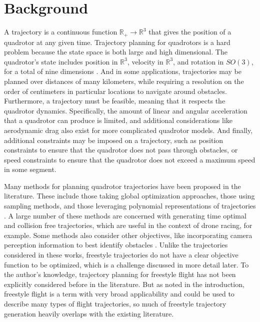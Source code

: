 \documentclass[pageno]{jpaper}
\begin{document}
\section{Background}

A trajectory is a continuous function $\mathbb{R}_+ \to \mathbb{R}^3$ that gives the position of a quadrotor at any given time. Trajectory planning for quadrotors is a hard problem because the state space is both large and high dimensional. The quadrotor's state includes position in $\mathbb{R}^3$, velocity in $\mathbb{R}^3$, and rotation in $SO(3)$, for a total of nine dimensions \cite{mueller}. And in some applications, trajectories may be planned over distances of many kilometers, while requiring a resolution on the order of centimeters in particular locations to navigate around obstacles. Furthermore, a trajectory must be feasible, meaning that it respects the quadrotor dynamics. Specifically, the amount of linear and angular acceleration that a quadrotor can produce is limited, and additional considerations like aerodynamic drag also exist for more complicated quadrotor models. And finally, additional constraints may be imposed on a trajectory, such as position constraints to ensure that the quadrotor does not pass through obstacles, or speed constraints to ensure that the quadrotor does not exceed a maximum speed in some segment.

Many methods for planning quadrotor trajectories have been proposed in the literature. These include those taking global optimization approaches, those using sampling methods, and those leveraging polynomial representations of trajectories \cite{hanover}. A large number of these methods are concerned with generating time optimal and collision free trajectories, which are useful in the context of drone racing, for example. Some methods also consider other objectives, like incorporating camera perception information to best identify obstacles \cite{zhou}. Unlike the trajectories considered in these works, freestyle trajectories do not have a clear objective function to be optimized, which is a challenge discussed in more detail later. To the author's knowledge, trajectory planning for freestyle flight has not been explicitly considered before in the literature. But as noted in the introduction, freestyle flight is a term with very broad applicability and could be used to describe many types of flight trajectories, so much of freestyle trajectory generation heavily overlaps with the existing literature.
\end{document}
